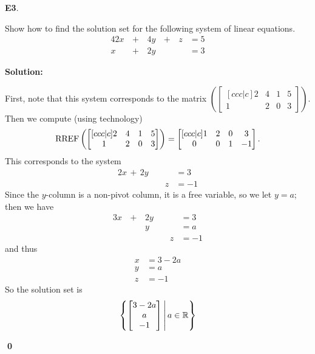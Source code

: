 \documentclass{article}
\newenvironment{problem}[1]
{
  \begin{flushleft}
  \textbf{#1}.
  \ignorespaces
}
{
  \end{flushleft}
}
\newenvironment{solution}
{
  \ignorespaces
  \textbf{Solution:}
}
{
  \ignorespacesafterend
  \begin{flushright}
  {\bfseries \qed}
  \end{flushright}
}
\begin{document}
\begin{problem}{E3}
Show how to find the solution set for the following system of linear equations.
\begin{alignat*}{4}
2x&\,+\,&4y&\,+\,&z &= 5 \\
x&\,+\,&2y &\,\,& &= 3
\end{alignat*}
\end{problem}
\begin{solution}
First, note that this system corresponds to the matrix 
\( \left( \begin{bmatrix}[ccc|c] 2 & 4 & 1 & 5 \\ 1 & 2 & 0 & 3 \end{bmatrix} \right)\).
Then we compute (using technology) 
\[
  \operatorname{RREF} \left(
    \begin{bmatrix}[ccc|c] 2 & 4 & 1 & 5 \\ 1 & 2 & 0 & 3 \end{bmatrix}
  \right)
    =
  \begin{bmatrix}[ccc|c] 1 & 2 & 0 & 3 \\ 0 & 0 & 1 & -1\end{bmatrix}.
\]
This corresponds to the system
\begin{alignat*}{2}
x\,+\,2y&\,\,&  &= 3 \\
  &\,\,& z&= -1
\end{alignat*}
Since the $y$-column is a non-pivot column, it is a free variable, so we let $y=a$; then we have
\begin{alignat*}{3}
x&\,+\,&2y&\,\,&  &= 3 \\
 &\,\,&y &\,\,& &=a \\
 &\,\,& &\,\,& z&= -1
\end{alignat*}
and thus
\begin{align*}
x&= 3-2a \\
y&= a \\
z&= -1
\end{align*}
So the solution set is
\[
  \left\{
    \begin{bmatrix} 3-2a \\ a \\ -1 \end{bmatrix}
  \,\middle|\,
    a \in \mathbb{R}
  \right\}
\]
\end{solution}
\end{document}

